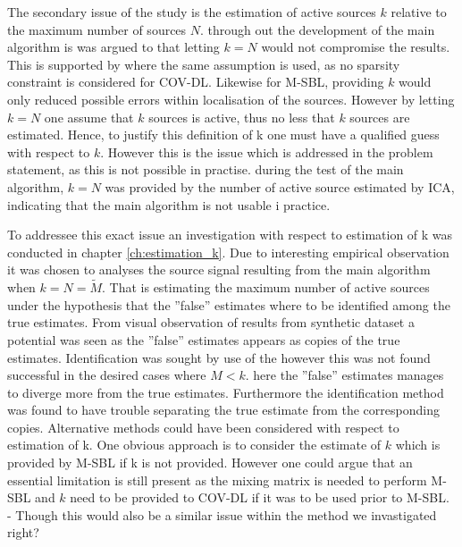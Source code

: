 The secondary issue of the study is the estimation of active sources $k$ relative to the maximum number of sources $N$. through out the development of the main algorithm is was argued to that letting $k=N$ would not compromise the results. This is supported by \cite{cov} where the same assumption is used, as no sparsity constraint is considered for COV-DL. Likewise for M-SBL, providing $k$ would only reduced possible errors within localisation of the sources.
However by letting $k=N$ one assume that $k$ sources is active, thus no less that $k$ sources are estimated. Hence, to justify this definition of k one must have a qualified guess with respect to $k$. However this is the issue which is addressed in the problem statement, as this is not possible in practise. during the test of the main algorithm, $k=N$ was provided by the number of active source estimated by ICA, indicating that the main algorithm is not usable i practice. 

To addressee this exact issue an investigation with respect to estimation of k was conducted in chapter \ref{ch:estimation_k}. 
Due to interesting empirical observation it was chosen to analyses the source signal resulting from the main algorithm when $k=N=\widetilde{M}$. That is estimating the maximum number of active sources under the hypothesis that the ''false'' estimates where to be identified among the true estimates. 
From visual observation of results from synthetic dataset a potential was seen as the ''false'' estimates appears as copies of the true estimates. Identification was sought by use of the however this was not found successful in the desired cases where $M<k$. here the ''false'' estimates manages to diverge  more from the true estimates. Furthermore the identification method was found to have trouble separating the true estimate from the corresponding copies.
Alternative methods could have been considered with respect to estimation of k. One obvious approach is to consider the estimate of $k$ which is provided by M-SBL if k is not provided. However one could argue that an essential limitation is still present as the mixing matrix is needed to perform M-SBL and $k$ need to be provided to COV-DL if it was to be used prior to M-SBL. - Though this would also be a similar issue within the method we invastigated right? 

      
        


       
 